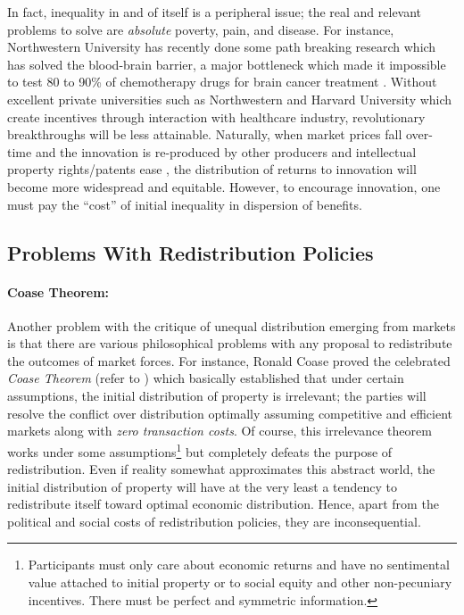 \documentclass[12pt]{article}
\newcommand{\1}{\mathbbm 1}
\begin{document}
In fact, inequality in and of itself is a peripheral issue; the real and relevant problems to solve are \textit{absolute} poverty, pain, and disease. For instance, Northwestern University has recently done some path breaking research which has solved the blood-brain barrier, a major bottleneck which made it impossible to test 80 to 90\% of chemotherapy drugs for brain cancer treatment \cite{schoen2022towards}. Without excellent private universities such as Northwestern and Harvard University which create incentives through interaction with healthcare industry, revolutionary breakthroughs will be less attainable. Naturally, when market prices fall over-time and the innovation is re-produced by other producers and intellectual property rights/patents ease \cite{kanwar2006innovation}, the distribution of returns to innovation will become more widespread and equitable. However, to encourage innovation, one must pay the ``cost'' of initial inequality in dispersion of benefits.





			
		
	
		\subsection{Problems With Redistribution Policies}
		
		
		\paragraph{Coase Theorem:} Another problem with the critique of unequal distribution emerging from markets is that there are various philosophical problems with any proposal to redistribute the outcomes of market forces. For instance, Ronald Coase proved the celebrated \textit{Coase Theorem} (refer to \cite{coase1981coase}) which basically established that under certain assumptions, the initial distribution of property is irrelevant; the parties will resolve the conflict over distribution optimally assuming competitive and efficient markets along with \textit{zero transaction costs}. Of course, this irrelevance theorem works under some assumptions\footnote{Participants must only care about economic returns and have no sentimental value attached to initial property or to social equity and other non-pecuniary incentives. There must be perfect and symmetric information.} but completely defeats the purpose of redistribution. Even if reality somewhat approximates this abstract world, the initial distribution of property will have at the very least a tendency to redistribute itself toward optimal economic distribution. Hence, apart from the political and social costs of redistribution policies, they are inconsequential. 
		
\end{document}
